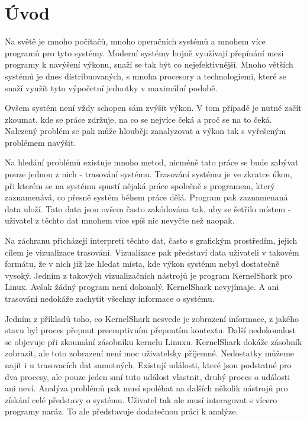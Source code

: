 \chapter*{Úvod}

Na světě je mnoho počítačů, mnoho operačních systémů a mnohem více programů pro tyto systémy. Moderní systémy hojně využívají přepínání mezi programy k navýšení výkonu, snaží se tak být co nejefektivnější. Mnoho větších systémů je dnes distribuovaných, s mnoha procesory a technologiemi, které se snaží využít tyto výpočetní jednotky v maximální podobě.

Ovšem systém není vždy schopen sám zvýšit výkon. V tom případě je nutné začít zkoumat, kde se práce zdržuje, na co se nejvíce čeká a proč se na to čeká. Nalezený problém se pak může hlouběji zanalyzovat a výkon tak s vyřešeným problémem navýšit.

Na hledání problémů existuje mnoho metod, nicméně tato práce se bude zabývat pouze jednou z nich - trasování systému. Trasování systému je ve zkratce úkon, při kterém se na systému spustí nějaká práce společně s programem, který zaznamenává, co přesně systém během práce dělá. Program pak zaznamenaná data uloží. Tato data jsou ovšem často zakódována tak, aby se šetřilo místem - uživatel z těchto dat mnohem více spíš nic nevyčte než naopak.

Na záchranu přicházejí interpreti těchto dat, často s grafickým prostředím, jejich cílem je vizualizace trasování. Vizualizace pak představí data uživateli v takovém formátu, že v nich již lze hledat místa, kde výkon systému nebyl dostatečně vysoký. Jedním z takových vizualizačních nástrojů je program KernelShark pro Linux. Avšak žádný program není dokonalý, KernelShark nevyjímaje. A ani trasování nedokáže zachytit všechny informace o systému.

Jedním z příkladů toho, co KernelShark nesvede je zobrazení informace, z jakého stavu byl proces přepnut preemptivním přepnutím kontextu. Další nedokonalost se objevuje při zkoumání zásobníku kernelu Linuxu. KernelShark dokáže zásobník zobrazit, ale toto zobrazení není moc uživatelsky příjemné. Nedostatky můžeme najít i u trasovacích dat samotných. Existují události, které jsou podstatné pro dva procesy, ale pouze jeden smí tuto událost vlastnit, druhý proces o události ani neví. Analýza problémů pak musí spoléhat na dalších několik nástrojů pro získání celé představy o systému. Uživatel tak ale musí interagovat s vícero programy naráz. To ale představuje dodatečnou práci k analýze.

